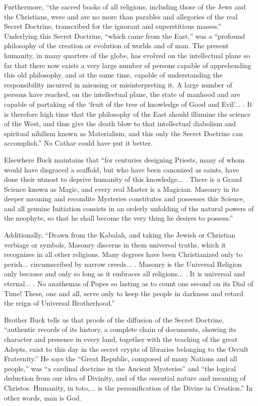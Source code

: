 Furthermore, ``the sacred books of all religions, including those of the Jews and the Christians, were and are no more than parables and allegories of the real Secret Doctrine, transcribed for the ignorant and superstitious masses.'' Underlying this Secret Doctrine, ``which came from the East,'' was a ``profound philosophy of the creation or evolution of worlds and of man. The present humanity, in many quarters of the globe, has evolved on the intellectual plane so far that there now exists a very large number of persons capable of apprehending this old philosophy, and at the same time, capable of understanding the responsibility incurred in misusing or misinterpreting it. A large number of persons have reached, on the intellectual plane, the state of manhood and are capable of partaking of the `fruit of the tree of knowledge of Good and Evil'... . It is therefore high time that the philosophy of the East should illumine the science of the West, and thus give the death blow to that intellectual diabolism and spiritual nihilism known as Materialism, and this only the Secret Doctrine can accomplish.'' No Cathar could have put it better.

Elsewhere Buck maintains that ``for centuries designing Priests, many of whom would have disgraced a scaffold, but who have been canonized as saints, have done their utmost to deprive humanity of this knowledge... . There is a Grand Science known as Magic, and every real Master is a Magician. Masonry in its deeper meaning and recondite Mysteries constitutes and possesses this Science, and all genuine Initiation consists in an orderly unfolding of the natural powers of the neophyte, so that he shall become the very thing he desires to possess.''

Additionally, ``Drawn from the Kabalah, and taking the Jewish or Christian verbiage or symbols, Masonry discerns in them universal truths, which it recognizes in all other religions. Many degrees have been Christianized only to perish... circumscribed by narrow creeds... . Masonry is the Universal Religion only because and only so long as it embraces all religions... . It is universal and eternal... . No anathemas of Popes so lasting as to count one second on its Dial of Time! These, one and all, serve only to keep the people in darkness and retard the reign of Universal Brotherhood.''

Brother Buck tells us that proofs of the diffusion of the Secret Doctrine, ``authentic records of its history, a complete chain of documents, showing its character and presence in every land, together with the teaching of the great Adepts, exist to this day in the secret crypts of libraries belonging to the Occult Fraternity.'' He says the ``Great Republic, composed of many Nations and all people,'' was ``a cardinal doctrine in the Ancient Mysteries'' and ``the logical deduction from our idea of Divinity, and of the essential nature and meaning of Christos. Humanity, in toto,... is the personification of the Divine in Creation.'' In other words, man is God.

